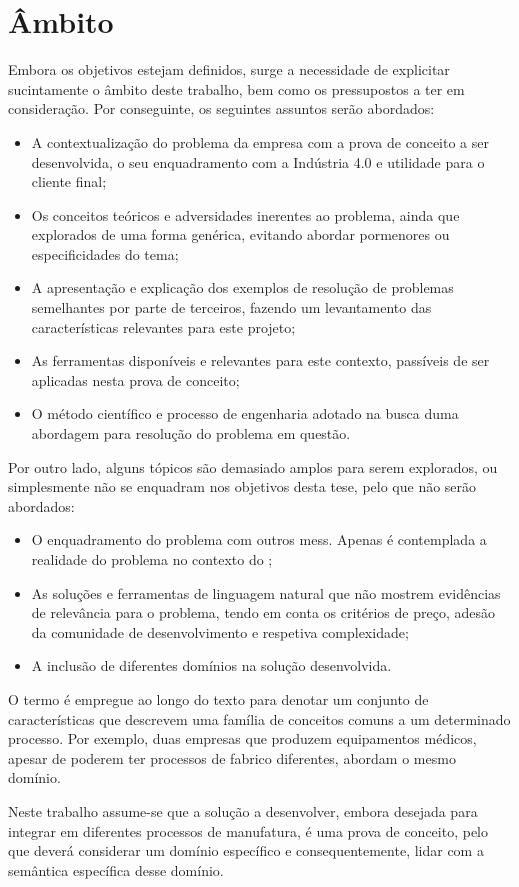\section{Âmbito}
\label{sec:chap01_scope}
Embora os objetivos estejam definidos, surge a necessidade de explicitar sucintamente o âmbito deste trabalho, bem como os pressupostos a ter em consideração. Por conseguinte, os seguintes assuntos serão abordados:

\begin{itemize}
    \item
    {
        A contextualização do problema da empresa com a prova de conceito a ser desenvolvida, o seu enquadramento com a Indústria 4.0 e utilidade para o cliente final; 
    }
    \item 
    {
        Os conceitos teóricos e adversidades inerentes ao problema, ainda que explorados de uma forma genérica, evitando abordar pormenores ou especificidades do tema;
    }
    \item
    {
        A apresentação e explicação dos exemplos de resolução de problemas semelhantes por parte de terceiros, fazendo um levantamento das características relevantes para este projeto;
    }
    \item
    {
        As ferramentas disponíveis e relevantes para este contexto, passíveis de ser aplicadas nesta prova de conceito;
    }
    \item
    {
        O método científico e processo de engenharia adotado na busca duma abordagem para resolução do problema em questão.
    }
\end{itemize}

Por outro lado, alguns tópicos são demasiado amplos para serem explorados, ou simplesmente não se enquadram nos objetivos desta tese, pelo que não serão abordados:

\begin{itemize}
    \item
    {
        O enquadramento do problema com outros \glspl{mes}. Apenas é contemplada a realidade do problema no contexto do {\productname};
    }
    \item
    {
        As soluções e ferramentas de linguagem natural que não mostrem evidências de relevância para o problema, tendo em conta os critérios de preço, adesão da comunidade de desenvolvimento e respetiva complexidade;
    }
    \item 
    {
        A inclusão de diferentes domínios na solução desenvolvida.
    }
\end{itemize}

O termo  é empregue ao longo do texto para denotar um conjunto de características que descrevem uma família de conceitos comuns a um determinado processo. Por exemplo, duas empresas que produzem equipamentos médicos, apesar de poderem ter processos de fabrico diferentes, abordam o mesmo domínio.

Neste trabalho assume-se que a solução a desenvolver, embora desejada para integrar em diferentes processos de manufatura, é uma prova de conceito, pelo que deverá considerar um domínio específico e consequentemente, lidar com a semântica específica desse domínio.